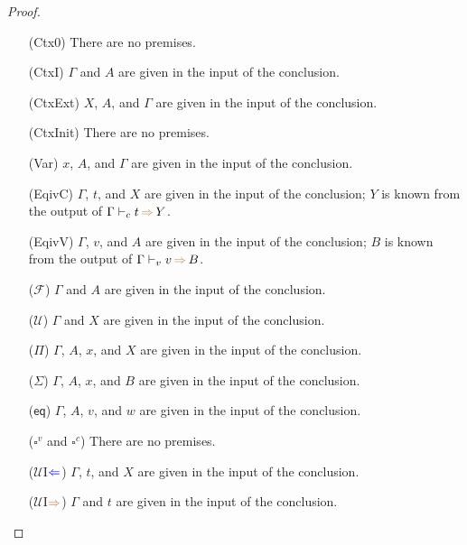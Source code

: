 \documentclass[a4,natbib=false]{article}
\newcommand{\ctov}{\mathcal{U}}
\newcommand{\vtoc}{\mathcal{F}}
\newcommand{\unival}{\square^{v}}
\newcommand{\unicomp}{\square^{c}}
\newcommand{\checks}{{\color{blue} \Leftarrow}}
\newcommand{\infers}{{\color{brown} \Rightarrow}}
\newcommand{\judgecInfer}[3]{{#1} \vdash_{c} {#2} \, \infers \, {#3}}
\newcommand{\judgevInfer}[3]{{#1} \vdash_{v} {#2} \, \infers \, {#3}}
\begin{document}
\begin{proof}
  \newcommand{\fromconcl}{given in the input of the conclusion}

  \begin{multicols}{2}
  \begin{itemize}
      \item[(Ctx0)]
        There are no premises.

      \item[(CtxI)]
        $\Gamma$ and $A$ are \fromconcl.

      \item[(CtxExt)]
        $X$, $A$, and $\Gamma$ are \fromconcl.

      \item[(CtxInit)]
        There are no premises. 

      \item[(Var)]
        $x$, $A$, and $\Gamma$ are \fromconcl.

      \item[(EqivC)]
        $\Gamma$, $t$, and $X$ are \fromconcl;
        $Y$ is known from the output of $\judgecInfer{\Gamma}{t}{Y}$.

      \item[(EqivV)]
        $\Gamma$, $v$, and $A$ are \fromconcl;
        $B$ is known from the output of $\judgevInfer{\Gamma}{v}{B}$.

      \item[($\vtoc$)]
        $\Gamma$ and $A$ are \fromconcl.

      \item[($\ctov$)]
        $\Gamma$ and $X$ are \fromconcl.

      \item[($\Pi$)]
        $\Gamma$, $A$, $x$, and $X$ are \fromconcl.

      \item[($\Sigma$)]
        $\Gamma$, $A$, $x$, and $B$ are \fromconcl.

      \item[($\mathsf{eq}$)]
        $\Gamma$, $A$, $v$, and $w$ are \fromconcl.

      \item[($\unival$ and $\unicomp$)]
        There are no premises.

      \item[($\ctov$I$\checks$)]
        $\Gamma$, $t$, and $X$ are \fromconcl.

      \item[($\ctov$I$\infers$)]
        $\Gamma$ and $t$ are \fromconcl.


\end{itemize}
\end{multicols}
\end{proof}
\end{document}
